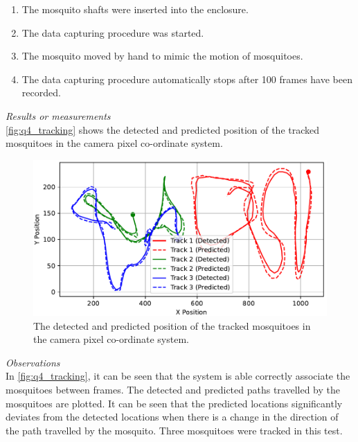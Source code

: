 \begin{enumerate}
  \item The mosquito shafts were inserted into the enclosure.
  \item The data capturing procedure was started.
  \item The mosquito moved by hand to mimic the motion of mosquitoes.
  \item The data capturing procedure automatically stops after 100 frames have been recorded.
\end{enumerate}

\textit{Results or measurements}\\
\autoref{fig:q4_tracking} shows the detected and predicted position of the tracked mosquitoes in the camera pixel co-ordinate system.
\begin{figure}[h]
  \centering
  \includegraphics[width=\textwidth]{figures/results/tracking.pdf}
  \caption{The detected and predicted position of the tracked mosquitoes in the camera pixel co-ordinate system.}
  \label{fig:q4_tracking}
\end{figure}

\textit{Observations}\\
In \autoref{fig:q4_tracking}, it can be seen that the system is able correctly associate the mosquitoes between frames. The detected and predicted paths travelled by the mosquitoes are plotted. It can be seen that the predicted locations significantly deviates from the detected locations when there is a change in the direction of the path travelled by the mosquito. Three mosquitoes were tracked in this test.

\newpage



